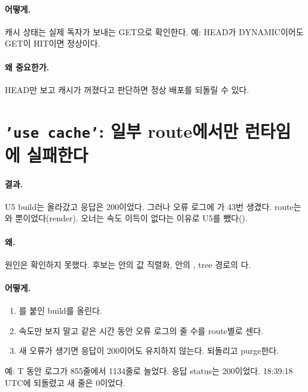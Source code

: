 \paragraph{어떻게.}
캐시 상태는 실제 독자가 보내는 GET으로 확인한다. 예: HEAD가 DYNAMIC이어도 GET이 HIT이면 정상이다.

\paragraph{왜 중요한가.}
HEAD만 보고 캐시가 꺼졌다고 판단하면 정상 배포를 되돌릴 수 있다.

\section{\texttt{'use cache'}: 일부 route에서만 런타임에 실패한다}\label{sec:le-usecache}

\paragraph{결과.}
U5 build는 올라갔고 응답은 200이었다. 그러나  오류 로그에 가 43번 생겼다.
route는 와 뿐이었다(render).
오너는 속도 이득이 없다는 이유로 U5를 뺐다().

\paragraph{왜.}
원인은 확인하지 못했다. 후보는  안의 값 직렬화,  안의 , tree 경로의 다.

\paragraph{어떻게.}
\begin{enumerate}[nosep]
  \item {}를 붙인 build를 올린다.
  \item 속도만 보지 말고 같은 시간 동안 오류 로그의 줄 수를 route별로 센다.
  \item 새 오류가 생기면 응답이 200이어도 유지하지 않는다. 되돌리고 purge한다.
\end{enumerate}
예: T 동안 로그가 855줄에서 1134줄로 늘었다. 응답 status는 200이었다. 18:39:18 UTC에 되돌렸고 새 줄은 0이었다.

